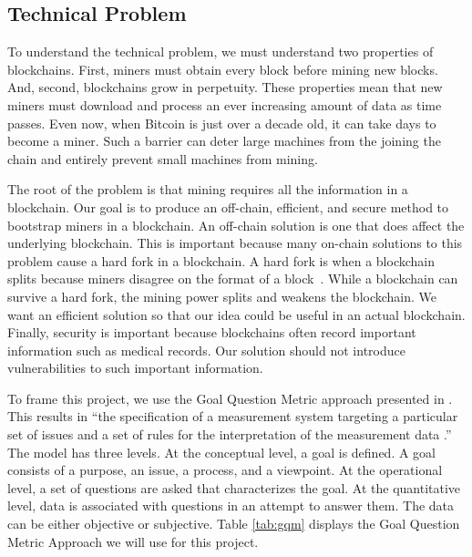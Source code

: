 

\subsection{Technical Problem}

To understand the technical problem, we must understand two properties of blockchains.
First, miners must obtain every block before mining new blocks.
And, second, blockchains grow in perpetuity.
These properties mean that new miners must download and process an ever increasing amount of data as time passes.
Even now, when Bitcoin is just over a decade old, it can take days to become a miner. %
Such a barrier can deter large machines from the joining the chain and entirely prevent small machines from mining.

The root of the problem is that mining requires all the information in a blockchain.
Our goal is to produce an off-chain, efficient, and secure method to bootstrap miners in a blockchain.
An off-chain solution is one that does affect the underlying blockchain.
This is important because many on-chain solutions to this problem cause a hard fork in a blockchain.
A hard fork is when a blockchain splits because miners disagree on the format of a block~\cite{lin2017Survey}.
While a blockchain can survive a hard fork, the mining power splits and weakens the blockchain.
We want an efficient solution so that our idea could be useful in an actual blockchain.
Finally, security is important because blockchains often record important information such as medical records. 
Our solution should not introduce vulnerabilities to such important information.

To frame this project, we use the Goal Question Metric approach presented in \cite{basili1994goal}.
This results in ``the specification of a measurement system targeting a particular set of issues and a set of rules for the interpretation of the measurement data \cite{basili1994goal}.''
The model has three levels.
At the conceptual level, a goal is defined.
A goal consists of a purpose, an issue, a process, and a viewpoint.
At the operational level, a set of questions are asked that characterizes the goal.
At the quantitative level, data is associated with questions in an attempt to answer them.
The data can be either objective or subjective.
Table \ref{tab:gqm} displays the Goal Question Metric Approach we will use for this project.

\newpage 

